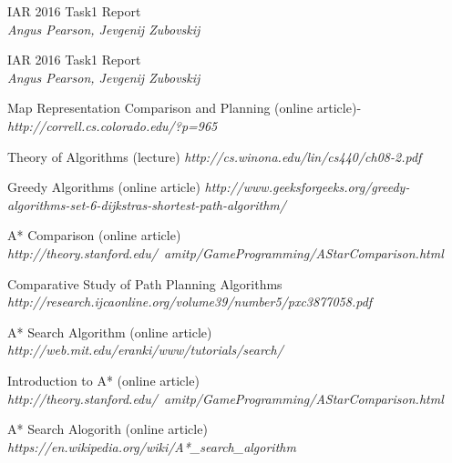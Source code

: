 \documentclass[11pt, a4paper]{article}
\begin{document}
\newpage
\begin{thebibliography}{}

\par{IAR 2016 Task1 Report} \\
\textit{Angus Pearson, Jevgenij Zubovskij}

\par{IAR 2016 Task1 Report} \\
\textit{Angus Pearson, Jevgenij Zubovskij}



\par{Map Representation Comparison and Planning (online article)}-
\textit{http://correll.cs.colorado.edu/?p=965}



\par{Theory of Algorithms (lecture)}
\textit{http://cs.winona.edu/lin/cs440/ch08-2.pdf}

\par{Greedy Algorithms (online article)}
\textit{http://www.geeksforgeeks.org/greedy-algorithms-set-6-dijkstras-shortest-path-algorithm/}

\par{A* Comparison (online article)}
\textit{http://theory.stanford.edu/~amitp/GameProgramming/AStarComparison.html}

\par{Comparative Study of Path Planning Algorithms}
\textit{http://research.ijcaonline.org/volume39/number5/pxc3877058.pdf}

\par{A* Search Algorithm (online article)}
\textit{http://web.mit.edu/eranki/www/tutorials/search/}



\par{Introduction to A* (online article)}
\textit{http://theory.stanford.edu/~amitp/GameProgramming/AStarComparison.html}



\par{A* Search Alogorith (online article)}
\textit{https://en.wikipedia.org/wiki/A*\_search\_algorithm}




\end{thebibliography}
\end{document}
